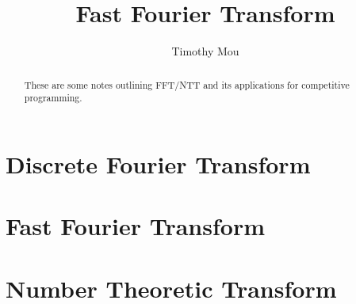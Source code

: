 \documentclass[11pt]{scrartcl}
\begin{document}
\title{Fast Fourier Transform}
\author{Timothy Mou}
\maketitle

\tableofcontents

\begin{abstract}
  These are some notes outlining FFT/NTT and its applications for competitive programming.
\end{abstract}

\section{Discrete Fourier Transform}

\section{Fast Fourier Transform}



\section{Number Theoretic Transform}
\end{document}
